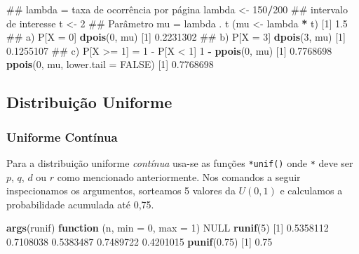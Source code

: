 \documentclass[10pt,a4paper]{book}
\newenvironment{Shaded}{\begin{snugshade}}{\end{snugshade}}
\newcommand{\KeywordTok}[1]{\textcolor[rgb]{0.13,0.29,0.53}{\textbf{#1}}}
\newcommand{\DataTypeTok}[1]{\textcolor[rgb]{0.13,0.29,0.53}{#1}}
\newcommand{\DecValTok}[1]{\textcolor[rgb]{0.00,0.00,0.81}{#1}}
\newcommand{\FloatTok}[1]{\textcolor[rgb]{0.00,0.00,0.81}{#1}}
\newcommand{\StringTok}[1]{\textcolor[rgb]{0.31,0.60,0.02}{#1}}
\newcommand{\OtherTok}[1]{\textcolor[rgb]{0.56,0.35,0.01}{#1}}
\newcommand{\ControlFlowTok}[1]{\textcolor[rgb]{0.13,0.29,0.53}{\textbf{#1}}}
\newcommand{\OperatorTok}[1]{\textcolor[rgb]{0.81,0.36,0.00}{\textbf{#1}}}
\newcommand{\NormalTok}[1]{#1}
\begin{document}
\begin{Shaded}
\begin{Highlighting}[]
\NormalTok{## lambda = taxa de ocorrência por página}
\NormalTok{lambda <-}\StringTok{ }\DecValTok{150}\OperatorTok{/}\DecValTok{200}
\NormalTok{## intervalo de interesse}
\NormalTok{t <-}\StringTok{ }\DecValTok{2}
\NormalTok{## Parâmetro mu = lambda . t}
\NormalTok{(mu <-}\StringTok{ }\NormalTok{lambda }\OperatorTok{*}\StringTok{ }\NormalTok{t)}
\NormalTok{[}\DecValTok{1}\NormalTok{] }\FloatTok{1.5}
\NormalTok{## a) P[X = 0]}
\KeywordTok{dpois}\NormalTok{(}\DecValTok{0}\NormalTok{, mu)}
\NormalTok{[}\DecValTok{1}\NormalTok{] }\FloatTok{0.2231302}
\NormalTok{## b) P[X = 3]}
\KeywordTok{dpois}\NormalTok{(}\DecValTok{3}\NormalTok{, mu)}
\NormalTok{[}\DecValTok{1}\NormalTok{] }\FloatTok{0.1255107}
\NormalTok{## c) P[X >= 1] = 1 - P[X < 1]}
\DecValTok{1} \OperatorTok{-}\StringTok{ }\KeywordTok{ppois}\NormalTok{(}\DecValTok{0}\NormalTok{, mu)}
\NormalTok{[}\DecValTok{1}\NormalTok{] }\FloatTok{0.7768698}
\KeywordTok{ppois}\NormalTok{(}\DecValTok{0}\NormalTok{, mu, }\DataTypeTok{lower.tail =} \OtherTok{FALSE}\NormalTok{)}
\NormalTok{[}\DecValTok{1}\NormalTok{] }\FloatTok{0.7768698}
\end{Highlighting}
\end{Shaded}

\subsection{Distribuição Uniforme}\label{distribuiuxe7uxe3o-uniforme}

\subsubsection{Uniforme Contínua}\label{uniforme-contuxednua}

Para a distribuição uniforme \emph{contínua} usa-se as funções
\texttt{*unif()} onde \texttt{*} deve ser \(p\), \(q\), \(d\) ou \(r\)
como mencionado anteriormente. Nos comandos a seguir inspecionamos os
argumentos, sorteamos 5 valores da \(U(0,1)\) e calculamos a
probabilidade acumulada até 0,75.

\begin{Shaded}
\begin{Highlighting}[]
\KeywordTok{args}\NormalTok{(runif)}
\ControlFlowTok{function}\NormalTok{ (n, }\DataTypeTok{min =} \DecValTok{0}\NormalTok{, }\DataTypeTok{max =} \DecValTok{1}\NormalTok{) }
\OtherTok{NULL}
\KeywordTok{runif}\NormalTok{(}\DecValTok{5}\NormalTok{)}
\NormalTok{[}\DecValTok{1}\NormalTok{] }\FloatTok{0.5358112} \FloatTok{0.7108038} \FloatTok{0.5383487} \FloatTok{0.7489722} \FloatTok{0.4201015}
\KeywordTok{punif}\NormalTok{(}\FloatTok{0.75}\NormalTok{)}
\NormalTok{[}\DecValTok{1}\NormalTok{] }\FloatTok{0.75}
\end{Highlighting}
\end{Shaded}
\end{document}
